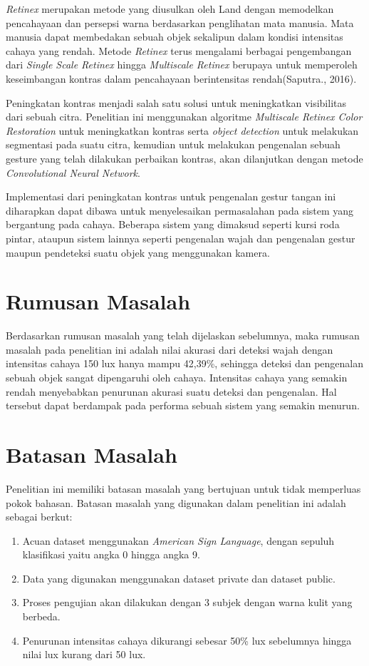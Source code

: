 \emph{Retinex} merupakan metode yang diusulkan oleh Land dengan memodelkan pencahayaan dan persepsi warna berdasarkan penglihatan mata manusia. Mata manusia dapat membedakan sebuah objek sekalipun dalam kondisi intensitas cahaya yang rendah. Metode \emph{Retinex} terus mengalami berbagai pengembangan dari \emph{Single Scale Retinex} hingga \emph{Multiscale Retinex} berupaya untuk memperoleh keseimbangan kontras dalam pencahayaan berintensitas rendah(Saputra., 2016).

Peningkatan kontras menjadi salah satu solusi untuk meningkatkan visibilitas dari sebuah citra. Penelitian ini menggunakan algoritme \emph{Multiscale Retinex Color Restoration} untuk meningkatkan kontras serta \emph{object detection} untuk melakukan segmentasi pada suatu citra, kemudian untuk melakukan pengenalan sebuah gesture yang telah dilakukan perbaikan kontras, akan dilanjutkan dengan metode \emph{Convolutional Neural Network}. 

Implementasi dari peningkatan kontras untuk pengenalan gestur tangan ini diharapkan dapat dibawa untuk menyelesaikan permasalahan pada sistem yang bergantung pada cahaya. Beberapa sistem yang dimaksud seperti kursi roda pintar, ataupun sistem lainnya seperti pengenalan wajah dan pengenalan gestur maupun pendeteksi suatu objek yang menggunakan kamera. 
\section{Rumusan Masalah}
Berdasarkan rumusan masalah yang telah dijelaskan sebelumnya, maka rumusan masalah pada penelitian ini adalah nilai akurasi dari deteksi wajah dengan intensitas cahaya 150 lux hanya mampu 42,39\%, sehingga deteksi dan pengenalan sebuah objek sangat dipengaruhi oleh cahaya. Intensitas cahaya yang semakin rendah menyebabkan penurunan akurasi suatu deteksi dan pengenalan. Hal tersebut dapat berdampak pada performa sebuah sistem yang semakin menurun. 
\section{Batasan Masalah}
Penelitian ini memiliki batasan masalah yang bertujuan untuk tidak memperluas pokok bahasan. Batasan masalah yang digunakan dalam penelitian ini adalah sebagai berkut:
\begin{enumerate}
\item Acuan dataset menggunakan \emph{American Sign Language}, dengan sepuluh klasifikasi yaitu angka 0 hingga angka 9.
\item Data yang digunakan menggunakan dataset private dan dataset public.
\item Proses pengujian akan dilakukan dengan 3 subjek dengan warna kulit yang berbeda.
\item Penurunan intensitas cahaya dikurangi sebesar 50\% lux sebelumnya hingga nilai lux kurang dari 50 lux.
\end{enumerate}
